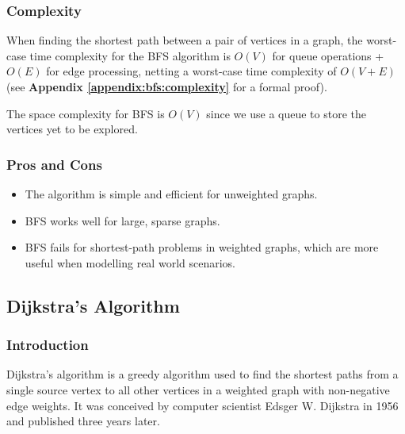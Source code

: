 		\subsubsection{Complexity}
			When finding the shortest path between a pair of vertices in a graph, the worst-case time complexity for the BFS algorithm is $O(V)$ for queue operations + $O(E)$ for edge processing, netting a worst-case time complexity of $O(V + E)$ (see \textbf{Appendix \ref{appendix:bfs:complexity}} for a formal proof). \medskip
			
			The space complexity for BFS is $O(V)$ since we use a queue to store the vertices yet to be explored.
		
		\subsubsection{Pros and Cons}
			\begin{itemize}
				\item The algorithm is simple and efficient for unweighted graphs.
				\item BFS works well for large, sparse graphs.
				\item BFS fails for shortest-path problems in weighted graphs, which are more useful when modelling real world scenarios.
			\end{itemize}
	\subsection{Dijkstra's Algorithm}
		\subsubsection{Introduction}
			Dijkstra's algorithm is a greedy algorithm used to find the shortest paths from a single source vertex to all other vertices in a weighted graph with non-negative edge weights. It was conceived by computer scientist Edsger W. Dijkstra in 1956 and published three years later.
